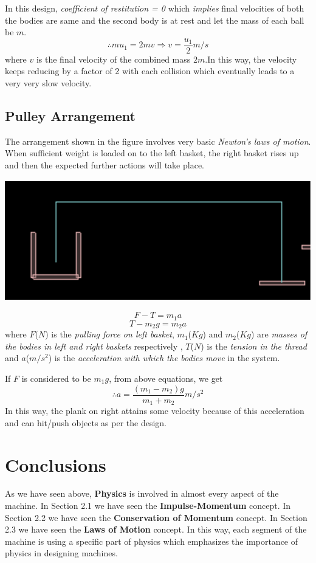 \documentclass[11]{article}
\begin{document}
In this design, \textit{coefficient of restitution = 0} which \textit{implies} final velocities of both the bodies are same\cite{collision} and the second body is at rest and let the mass of each ball be $m$.
\begin{equation}
\therefore mu_{1}=2mv
\Rightarrow v=\frac{u_{1}}{2} m/s
\end{equation} 
where $v$ is the final velocity of the combined mass $2m$.In this way, the velocity keeps reducing by a factor of 2 with each collision which eventually leads to a very very slow velocity.


\subsection{Pulley Arrangement}
The arrangement shown  in the figure involves very basic \emph{Newton's laws of motion}. When sufficient weight is loaded on to the left basket, the right basket rises up and then the expected further actions will take place.
\begin{center}
\includegraphics[scale=0.6]{3}
\end{center}
\begin{equation}
F-T = m_{1}a
\end{equation}
\begin{equation}
T-m_{2}g = m_{2}a
\end{equation}
where $F$($N$) is the \textit{pulling force on left basket}, $m_{1}$($Kg$) and $m_{2}$($Kg$) are \textit{masses of the bodies in left and right baskets} respectively , $T$($N$) is the \textit{tension in the thread} and $a$($m/s^2$) is the \textit{acceleration with which the bodies move} in the system.

If $F$ is considered to be $m_{1}g$, from above equations, we get
\begin{equation}
\therefore a=\frac{(m_{1}-m_{2})g}{m_{1}+m_{2}} m/s^2
\end{equation}
In this way, the plank on right attains some velocity because of this acceleration and can hit/push objects as per the design.
\section{Conclusions}
As we have seen above, \textbf{Physics} is involved in almost every aspect of the machine. In Section 2.1 we have seen the \textbf{Impulse-Momentum} concept. In Section 2.2 we have seen the \textbf{Conservation of Momentum} concept. In Section 2.3 we have seen the \textbf{Laws of Motion} concept. In this way, each segment of the machine is using a specific part of physics which emphasizes the importance of physics in designing machines\cite{dummy}.



\end{document}

